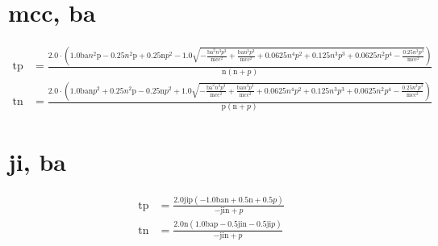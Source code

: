 \documentclass[3p,times]{elsarticle}
\begin{document}
\begin{footnotesize}
\begin{landscape}
\section{mcc, ba}
\begin{align}
\mathrm{tp} &= \frac{2.0 \cdot \left(1.0 \mathrm{ba} n^{2} \mathrm{p} - 0.25 n^{2} \mathrm{p} + 0.25 \mathrm{n} p^{2} - 1.0 \sqrt{- \frac{\mathrm{ba}^{2} n^{3} p^{3}}{\mathrm{mcc}^{2}} + \frac{\mathrm{ba} n^{3} p^{3}}{\mathrm{mcc}^{2}} + 0.0625 n^{4} p^{2} + 0.125 n^{3} p^{3} + 0.0625 n^{2} p^{4} - \frac{0.25 n^{3} p^{3}}{\mathrm{mcc}^{2}}}\right)}{\mathrm{n} \left(\mathrm{n} + p\right)}\\
\mathrm{tn} &= \frac{2.0 \cdot \left(1.0 \mathrm{ba} \mathrm{n} p^{2} + 0.25 n^{2} \mathrm{p} - 0.25 \mathrm{n} p^{2} + 1.0 \sqrt{- \frac{\mathrm{ba}^{2} n^{3} p^{3}}{\mathrm{mcc}^{2}} + \frac{\mathrm{ba} n^{3} p^{3}}{\mathrm{mcc}^{2}} + 0.0625 n^{4} p^{2} + 0.125 n^{3} p^{3} + 0.0625 n^{2} p^{4} - \frac{0.25 n^{3} p^{3}}{\mathrm{mcc}^{2}}}\right)}{\mathrm{p} \left(\mathrm{n} + p\right)}
\end{align}
\section{ji, ba}
\begin{align}
\mathrm{tp} &= \frac{2.0 \mathrm{ji} \mathrm{p} \left(- 1.0 \mathrm{ba} \mathrm{n} + 0.5 \mathrm{n} + 0.5 p\right)}{- \mathrm{ji} \mathrm{n} + p}\\
\mathrm{tn} &= \frac{2.0 \mathrm{n} \left(1.0 \mathrm{ba} \mathrm{p} - 0.5 \mathrm{ji} \mathrm{n} - 0.5 \mathrm{ji} p\right)}{- \mathrm{ji} \mathrm{n} + p}
\end{align}


\end{landscape}
\end{footnotesize}
\end{document}
